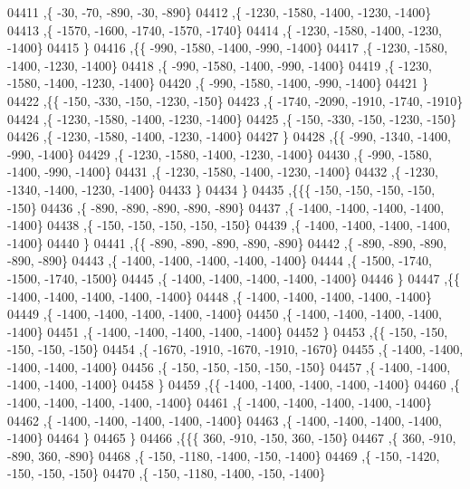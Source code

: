 \begin{DoxyCode}
04411     ,\{   -30,   -70,  -890,   -30,  -890\}
04412     ,\{ -1230, -1580, -1400, -1230, -1400\}
04413     ,\{ -1570, -1600, -1740, -1570, -1740\}
04414     ,\{ -1230, -1580, -1400, -1230, -1400\}
04415     \}
04416    ,\{\{  -990, -1580, -1400,  -990, -1400\}
04417     ,\{ -1230, -1580, -1400, -1230, -1400\}
04418     ,\{  -990, -1580, -1400,  -990, -1400\}
04419     ,\{ -1230, -1580, -1400, -1230, -1400\}
04420     ,\{  -990, -1580, -1400,  -990, -1400\}
04421     \}
04422    ,\{\{  -150,  -330,  -150, -1230,  -150\}
04423     ,\{ -1740, -2090, -1910, -1740, -1910\}
04424     ,\{ -1230, -1580, -1400, -1230, -1400\}
04425     ,\{  -150,  -330,  -150, -1230,  -150\}
04426     ,\{ -1230, -1580, -1400, -1230, -1400\}
04427     \}
04428    ,\{\{  -990, -1340, -1400,  -990, -1400\}
04429     ,\{ -1230, -1580, -1400, -1230, -1400\}
04430     ,\{  -990, -1580, -1400,  -990, -1400\}
04431     ,\{ -1230, -1580, -1400, -1230, -1400\}
04432     ,\{ -1230, -1340, -1400, -1230, -1400\}
04433     \}
04434    \}
04435   ,\{\{\{  -150,  -150,  -150,  -150,  -150\}
04436     ,\{  -890,  -890,  -890,  -890,  -890\}
04437     ,\{ -1400, -1400, -1400, -1400, -1400\}
04438     ,\{  -150,  -150,  -150,  -150,  -150\}
04439     ,\{ -1400, -1400, -1400, -1400, -1400\}
04440     \}
04441    ,\{\{  -890,  -890,  -890,  -890,  -890\}
04442     ,\{  -890,  -890,  -890,  -890,  -890\}
04443     ,\{ -1400, -1400, -1400, -1400, -1400\}
04444     ,\{ -1500, -1740, -1500, -1740, -1500\}
04445     ,\{ -1400, -1400, -1400, -1400, -1400\}
04446     \}
04447    ,\{\{ -1400, -1400, -1400, -1400, -1400\}
04448     ,\{ -1400, -1400, -1400, -1400, -1400\}
04449     ,\{ -1400, -1400, -1400, -1400, -1400\}
04450     ,\{ -1400, -1400, -1400, -1400, -1400\}
04451     ,\{ -1400, -1400, -1400, -1400, -1400\}
04452     \}
04453    ,\{\{  -150,  -150,  -150,  -150,  -150\}
04454     ,\{ -1670, -1910, -1670, -1910, -1670\}
04455     ,\{ -1400, -1400, -1400, -1400, -1400\}
04456     ,\{  -150,  -150,  -150,  -150,  -150\}
04457     ,\{ -1400, -1400, -1400, -1400, -1400\}
04458     \}
04459    ,\{\{ -1400, -1400, -1400, -1400, -1400\}
04460     ,\{ -1400, -1400, -1400, -1400, -1400\}
04461     ,\{ -1400, -1400, -1400, -1400, -1400\}
04462     ,\{ -1400, -1400, -1400, -1400, -1400\}
04463     ,\{ -1400, -1400, -1400, -1400, -1400\}
04464     \}
04465    \}
04466   ,\{\{\{   360,  -910,  -150,   360,  -150\}
04467     ,\{   360,  -910,  -890,   360,  -890\}
04468     ,\{  -150, -1180, -1400,  -150, -1400\}
04469     ,\{  -150, -1420,  -150,  -150,  -150\}
04470     ,\{  -150, -1180, -1400,  -150, -1400\}

\end{DoxyCode}
